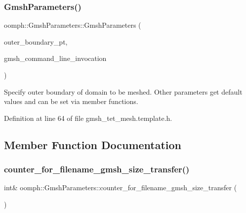 \subsubsection{\texorpdfstring{Gmsh\+Parameters()}{GmshParameters()}}
{\footnotesize\ttfamily oomph\+::\+Gmsh\+Parameters\+::\+Gmsh\+Parameters (\begin{DoxyParamCaption}\item[{Tet\+Mesh\+Faceted\+Closed\+Surface $\ast$const \&}]{outer\+\_\+boundary\+\_\+pt,  }\item[{const std\+::string \&}]{gmsh\+\_\+command\+\_\+line\+\_\+invocation }\end{DoxyParamCaption})\hspace{0.3cm}{\ttfamily [inline]}}



Specify outer boundary of domain to be meshed. Other parameters get default values and can be set via member functions. 



Definition at line 64 of file gmsh\+\_\+tet\+\_\+mesh.\+template.\+h.



\subsection{Member Function Documentation}
\mbox{\label{classoomph_1_1GmshParameters_acf8155883aab25f0fc13c1eab7c03e9c}} 
\subsubsection{\texorpdfstring{counter\+\_\+for\+\_\+filename\+\_\+gmsh\+\_\+size\+\_\+transfer()}{counter\_for\_filename\_gmsh\_size\_transfer()}}
{\footnotesize\ttfamily int\& oomph\+::\+Gmsh\+Parameters\+::counter\+\_\+for\+\_\+filename\+\_\+gmsh\+\_\+size\+\_\+transfer (\begin{DoxyParamCaption}{ }\end{DoxyParamCaption})\hspace{0.3cm}{\ttfamily [inline]}}




